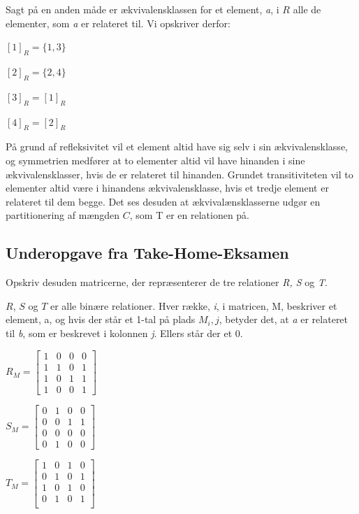 \documentclass{article}
\begin{document}
Sagt på en anden måde er ækvivalensklassen for et element, \emph{a}, i $R$ alle de elementer, som \emph{a} er relateret til. Vi opskriver derfor:

\begin{center}
$[1]_R = \{1, 3\}$ \par
$[2]_R = \{2, 4\}$ \par 
$[3]_R = [1]_R$ \par
$[4]_R = [2]_R$
\end{center}

På grund af refleksivitet vil et element altid have sig selv i sin ækvivalensklasse, og symmetrien medfører at to elementer altid vil have hinanden i sine ækvivalensklasser, hvis de er relateret til hinanden. Grundet transitiviteten vil to elementer altid være i hinandens ækvivalensklasse, hvis et tredje element er relateret til dem begge.
Det ses desuden at ækvivalænsklasserne udgør en partitionering af mængden $C$, som T er en relationen på.

\subsection{Underopgave fra Take-Home-Eksamen}
\begin{center}
Opskriv desuden matricerne, der repræsenterer de tre relationer \emph{R, S} og \emph{T}.
\end{center}

$R$, $S$ og $T$ er alle binære relationer. Hver række, \emph{i}, i matricen, M, beskriver et element, a, og hvis der står et 1-tal på plads $M_i,j$, betyder det, at \emph{a} er relateret til \emph{b}, som er beskrevet i kolonnen \emph{j}. Ellers står der et 0.

\begin{center}
\begin{math}
R_M = \begin{bmatrix}
1 & 0 & 0 & 0 \\
1 & 1 & 0 & 1 \\
1 & 0 & 1 & 1 \\
1 & 0 & 0 & 1 
\end{bmatrix} 
\end{math}\par 
\begin{math}
S_M = \begin{bmatrix}
0 & 1 & 0 & 0 \\
0 & 0 & 1 & 1 \\
0 & 0 & 0 & 0 \\
0 & 1 & 0 & 0 
\end{bmatrix}
\end{math} \par 
\begin{math}
T_M = \begin{bmatrix}
1 & 0 & 1 & 0 \\
0 & 1 & 0 & 1 \\
1 & 0 & 1 & 0 \\
0 & 1 & 0 & 1 \\
\end{bmatrix}
\end{math}
\end{center}
\end{document}
